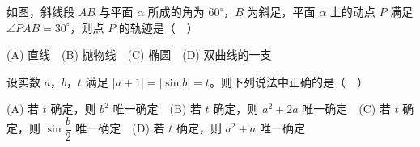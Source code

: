 \begin{question}
如图，斜线段 \(AB\) 与平面 \(\alpha\) 所成的角为 \(60^\circ\)，\(B\) 为斜足，平面 \(\alpha\) 上的动点 \(P\) 满足 \(\angle PAB=30^\circ\)，则点 \(P\) 的轨迹是（　）
\nopagebreak[4]
\begin{center}\end{center}
\nopagebreak[4]
(A) 直线　(B) 抛物线　(C) 椭圆　(D) 双曲线的一支

\end{question}
\begin{question}
设实数 \(a\)，\(b\)，\(t\) 满足 \(|a+1|=|\sin b|=t\)。则下列说法中正确的是（　）

(A) 若 \(t\) 确定，则 \(b^2\) 唯一确定　(B) 若 \(t\) 确定，则 \(a^2+2a\) 唯一确定　(C) 若 \(t\) 确定，则 \(\sin\dfrac{b}{2}\) 唯一确定　(D) 若 \(t\) 确定，则 \(a^2+a\) 唯一确定

\end{question}

